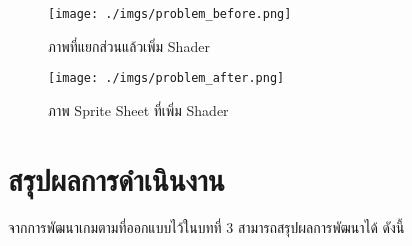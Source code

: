 \documentclass[12pt,oneside,openright,a4paper]{cpe-thai-project}
\begin{document}
              \begin{figure}[H]\centering
                \begin{minipage}{.4\textwidth}
                  \centering
                  \texttt{[image: ./imgs/problem\_before.png]}
                  \caption{ภาพที่แยกส่วนแล้วเพิ่ม Shader}\label{fig:problem1}
                \end{minipage}
                \begin{minipage}{.4\textwidth}
                  \centering
                  \texttt{[image: ./imgs/problem\_after.png]}
                  \caption{ภาพ Sprite Sheet ที่เพิ่ม Shader}\label{fig:solution1}
                \end{minipage}
              \end{figure}

\pagebreak
\section{สรุปผลการดำเนินงาน} 
จากการพัฒนาเกมตามที่ออกแบบไว้ในบทที่ 3 สามารถสรุปผลการพัฒนาได้ ดังนี้
\end{document}
